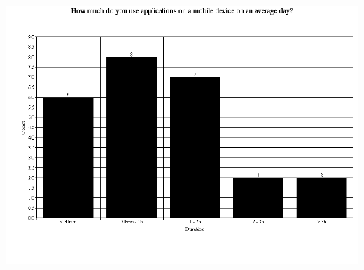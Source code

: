 \documentclass[twoside,11pt]{Latex/Classes/PhDthesisPSnPDF}
\begin{document}

\mainmatter

\renewcommand{\chaptername}{} %








\appendix{}
\chapter{}

\chapter{}
\includegraphics[scale=0.5]{Images/q1}
\end{document}
